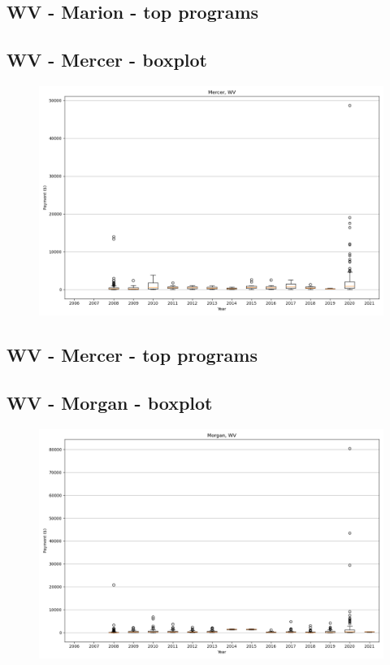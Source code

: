 \subsection*{WV - Marion - top programs}

\newpage
\subsection*{WV - Mercer - boxplot}
\begin{figure}[h]
\centering
\includegraphics[width=7in]{../output/boxplots/counties/Mercer-WV_boxplot.png}
\end{figure}


\subsection*{WV - Mercer - top programs}

\newpage
\subsection*{WV - Morgan - boxplot}
\begin{figure}[h]
\centering
\includegraphics[width=7in]{../output/boxplots/counties/Morgan-WV_boxplot.png}
\end{figure}


